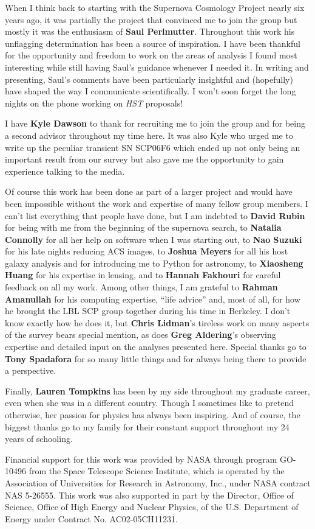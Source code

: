 When I think back to starting with the Supernova Cosmology Project
nearly six years ago, it was partially the project that convinced me
to join the group but mostly it was the enthusiasm of {\bf Saul
  Perlmutter}.  Throughout this work his unflagging determination has
been a source of inspiration. I have been thankful for the opportunity
and freedom to work on the areas of analysis I found most interesting
while still having Saul's guidance whenever I needed it. In writing
and presenting, Saul's comments have been particularly insightful
and (hopefully) have shaped the way I communicate scientifically. I
won't soon forget the long nights on the phone working on
\emph{HST} proposals!

I have {\bf Kyle Dawson} to thank for recruiting me to join the group and
for being a second advisor throughout my time here. It was also Kyle
who urged me to write up the peculiar transient SN SCP06F6 which ended
up not only being an important result from our survey but also gave me
the opportunity to gain experience talking to the media. 

Of course this work has been done as part of a larger project and
would have been impossible without the work and expertise of many
fellow group members. I can't list everything that people have done,
but I am indebted to {\bf David Rubin} for being with me from the
beginning of the supernova search, to {\bf Natalia Connolly} for all
her help on software when I was starting out, to {\bf Nao Suzuki} for
his late nights reducing ACS images, to {\bf Joshua Meyers} for all
his host galaxy analysis and for introducing me to Python for
astronomy, to {\bf Xiaosheng Huang} for his expertise in lensing, and
to {\bf Hannah Fakhouri} for careful feedback on all my work. Among
other things, I am grateful to {\bf Rahman Amanullah} for his
computing expertise, ``life advice'' and, most of all, for how he
brought the LBL SCP group together during his time in Berkeley. I
don't know exactly how he does it, but {\bf Chris Lidman}'s tireless
work on many aspects of the survey bears special mention, as does {\bf
Greg Aldering}'s observing expertise and detailed input on the
analyses presented here.  Special thanks go to {\bf Tony Spadafora}
for so many little things and for always being there to provide a
perspective.

Finally, {\bf Lauren Tompkins} has been by my side throughout my
graduate career, even when she was in a different country. Though I
sometimes like to pretend otherwise, her passion for physics has
always been inspiring. And of course, the biggest thanks go to my
family for their constant support throughout my 24 years of schooling.

\vspace{8pt}
Financial support for this work was provided by NASA through program
GO-10496 from the Space Telescope Science Institute, which is operated
by the Association of Universities for Research in Astronomy, Inc.,
under NASA contract NAS 5-26555.  This work was also supported in part
by the Director, Office of Science, Office of High Energy and Nuclear
Physics, of the U.S. Department of Energy under Contract
No. AC02-05CH11231.

